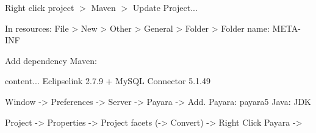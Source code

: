 \documentclass{article}
\begin{document}
	Right click project $>$ Maven $>$ Update Project...
	
	In resources: File > New > Other > General > Folder > Folder name: META-INF
	
	Add dependency Maven:
	\begin{itemize}
		content...
		Eclipselink 2.7.9 + MySQL Connector 5.1.49
	\end{itemize}

	Window -> Preferences -> Server -> Payara -> Add.
	Payara: payara5
	Java: JDK

	Project -> Properties -> Project facets (-> Convert) -> Right Click Payara -> 
\end{document}
